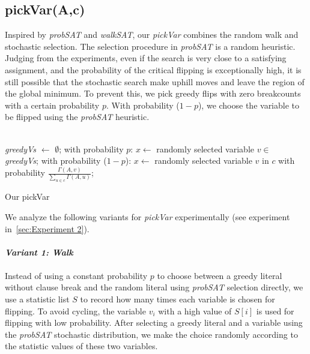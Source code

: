 \documentclass[12pt,a4paper,twoside]{scrartcl}
\numberwithin{equation}{section}
\begin{document}
\subsection{pickVar(A,c)}
Inspired by \emph{probSAT} and \emph{walkSAT}, our \emph{pickVar} combines the random walk and stochastic selection. 
The selection procedure in \emph{probSAT} is a random heuristic. Judging from the experiments, even if the search is very close to a satisfying assignment, and the probability of the critical flipping is exceptionally high, it is still possible that the stochastic search make uphill moves and leave the region of the global minimum. To prevent this,  we pick greedy flips with zero breakcounts with a certain probability $p$. With probability ($1-p$), we choose the variable to be flipped using the \emph{probSAT} heuristic.\\
\\
\begin{algorithm}[H]
 \emph{greedyVs} $\leftarrow$ $\emptyset$;\;
  with probability $p$: $x \leftarrow$ randomly selected variable $v \in$ \emph{greedyVs};  \;
  with probability ($1-p$):   $x \leftarrow$ randomly selected  variable $v$ in $c$ with probability $\frac{\Gamma(A,v)}{\sum_{u \in c}\Gamma(A,u)}$;  
\caption{Our pickVar}
\end{algorithm}  
We analyze the following variants for  \emph{pickVar} experimentally (see experiment in~\ref{sec:Experiment 2}).\\
\\ 
 \emph{\textbf{Variant 1: Walk}}\\
\\
Instead of using a constant probability $p$ to choose between a greedy literal without clause break and the random literal using \emph{probSAT} selection directly, we use a statistic list $S$ to record how many times each variable is chosen for flipping. To avoid cycling, the variable $v_i$ with a high value of $S[i]$ is used for flipping with low probability. After selecting a greedy literal and a variable using the \emph{probSAT} stochastic distribution, we make the choice randomly according to the statistic values of these two variables.\\
 \\
\end{document}
